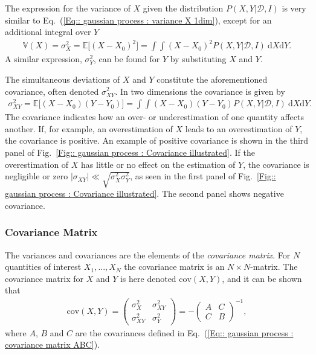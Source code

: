 \documentclass[twoside,english]{uiofysmaster}
\begin{document}
{The expression for the variance of $X$ given the distribution $P(X,Y| \mathcal{D}, I)$ is very similar to Eq.~(\ref{Eq:: gaussian process : variance X 1dim}), except for an additional integral over $Y$
\begin{align}
\mathbb{V}(X) = \sigma^2_X = \mathbb{E} \big[ (X-X_0)^2 \big] = \int \int (X-X_0)^2 P(X,Y | \mathcal{D}, I) ~\text{d}X\text{d}Y.
\end{align}
A similar expression, $\sigma_Y^2$, can be found for $Y$ by substituting $X$ and $Y$. 

The simultaneous deviations of $X$ and $Y$ constitute the aforementioned covariance, often denoted $\sigma_{XY}^2$. In two dimensions the covariance is given by
\begin{align}
\sigma_{XY}^2 = \mathbb{E} \big[(X - X_0) (Y - Y_0) \big] =\int \int (X - X_0) (Y - Y_0) P (X, Y | \mathcal{D}, I) ~\text{d}X\text{d}Y.
\end{align}
The covariance indicates how an over- or underestimation of one quantity affects another. If, for example, an overestimation of $X$ leads to an overestimation of $Y$, the covariance is positive. An example of positive covariance is shown in the third panel of Fig.~\ref{Fig:: gaussian process : Covariance illustrated}. If the overestimation of $X$ has little or no effect on the estimation of $Y$, the covariance is negligible or zero $|\sigma_{XY}| \ll \sqrt{\sigma_X^2 \sigma_Y^2}$, as seen in the first panel of Fig.~\ref{Fig:: gaussian process : Covariance illustrated}. The second panel shows negative covariance.

\subsubsection{Covariance Matrix}

The variances and covariances are the elements of the \textit{covariance matrix}. For $N$ quantities of interest $X_1, ...,X_N$ the covariance matrix is an $N \times N$-matrix. The covariance matrix for $X$ and $Y$ is here denoted $\text{cov}(X,Y)$, and it can be shown that \cite{sivia2006data}
\begin{align}
\text{cov}(X,Y) = 
\begin{pmatrix}
\sigma_X^2 & \sigma_{XY}^2\\
\sigma_{XY}^2 & \sigma_Y^2
\end{pmatrix}
= - \begin{pmatrix}
A & C\\
C & B
\end{pmatrix}^{-1},
\end{align}
where $A$, $B$ and $C$ are the covariances defined in Eq.~(\ref{Eq:: gaussian process : covariance matrix ABC}).

}
\end{document}
